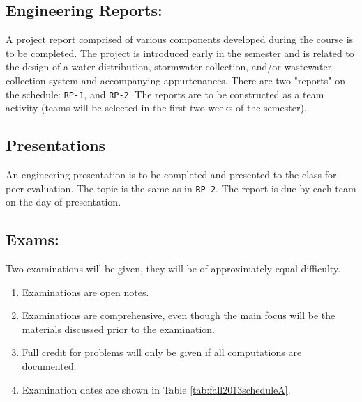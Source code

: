 \documentclass[12pt]{article}
\begin{document}
\subsection*{Engineering Reports:}  
A project report comprised of various components developed during the course is to be completed.  
The project is introduced early in the semester and is related to the design of a water distribution, stormwater collection, and/or wastewater collection system and accompanying appurtenances.    
There are two "reports" on the schedule: \texttt{RP-1}, and \texttt{RP-2}.  
The reports are to be constructed as a team activity (teams will be selected in the first two weeks of the semester).

\subsection*{Presentations}
An engineering presentation is to be completed and presented to the class for peer evaluation. 
The topic is the same as in \texttt{RP-2}.   The report is due by each team on the day of presentation.

\subsection*{Exams:} Two examinations will be given, they will be of approximately equal difficulty.
\begin{enumerate}
\item Examinations are open notes.
\item Examinations are comprehensive, even though the main focus will be the materials discussed prior to the examination.
\item Full credit for problems will only be given if all computations are documented.
\item Examination dates are shown in Table \ref{tab:fall2013scheduleA}.
\end{enumerate}
\newpage
\end{document}
